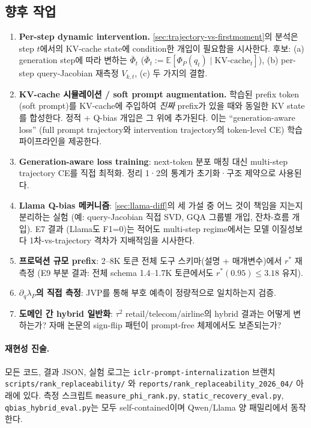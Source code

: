 \documentclass{article}
\theoremstyle{definition}
\newcommand{\E}{\mathbb{E}}
\newcommand{\bphi}{\bar{\Phi}}
\newcommand{\Phip}{\Phi_P}
\begin{document}
\subsection*{향후 작업}
\label{sec:future-work}
\begin{enumerate}[leftmargin=*, itemsep=2pt]
\item \textbf{Per-step dynamic intervention.} \cref{sec:trajectory-vs-firstmoment}의 분석은 step $t$에서의 KV-cache state에 condition한 개입이 필요함을 시사한다. 후보: (a) generation step에 따라 변하는 $\bphi_t$ ($\bphi_t := \E[\Phip(q_t) \mid \text{KV-cache}_{t}]$), (b) per-step query-Jacobian 재측정 $V_{k,t}$, (c) 두 가지의 결합.
\item \textbf{KV-cache 시뮬레이션 / soft prompt augmentation.} 학습된 prefix token (soft prompt)를 KV-cache에 주입하여 \emph{진짜} prefix가 있을 때와 동일한 KV state를 합성한다. 정적 + Q-bias 개입은 그 위에 추가된다. 이는 ``generation-aware loss'' (full prompt trajectory와 intervention trajectory의 token-level CE) 학습 파이프라인을 제공한다.
\item \textbf{Generation-aware loss training}: next-token 분포 매칭 대신 multi-step trajectory CE를 직접 최적화. 정리 1·2의 통계가 초기화·구조 제약으로 사용된다.
\item \textbf{Llama Q-bias 메커니즘}: \cref{sec:llama-diff}의 세 가설 중 어느 것이 책임을 지는지 분리하는 실험 (예: query-Jacobian 직접 SVD, GQA 그룹별 개입, 잔차-흐름 개입). E7 결과 (Llama도 F1=0)는 적어도 multi-step regime에서는 모델 이질성보다 1차-vs-trajectory 격차가 지배적임을 시사한다.
\item \textbf{프로덕션 규모 prefix}: 2--8K 토큰 전체 도구 스키마(설명 + 매개변수)에서 $r^*$ 재측정 (E9 부분 결과: 전체 schema 1.4--1.7K 토큰에서도 $r^*(0.95) \le 3.18$ 유지).
\item \textbf{$\partial_q \lambda_P$의 직접 측정}: JVP를 통해 부호 예측이 정량적으로 일치하는지 검증.
\item \textbf{도메인 간 hybrid 일반화}: $\tau^2$ retail/telecom/airline의 hybrid 결과는 어떻게 변하는가? 자매 논문의 sign-flip 패턴이 prompt-free 체제에서도 보존되는가?
\end{enumerate}

\paragraph{재현성 진술.}
모든 코드, 결과 JSON, 실험 로그는 \texttt{iclr-prompt-internalization} 브랜치 \texttt{scripts/rank\_replaceability/} 와 \texttt{reports/rank\_replaceability\_2026\_04/} 아래에 있다. 측정 스크립트 \texttt{measure\_phi\_rank.py}, \texttt{static\_recovery\_eval.py}, \texttt{qbias\_hybrid\_eval.py}는 모두 self-contained이며 Qwen/Llama 양 패밀리에서 동작한다.
\end{document}
